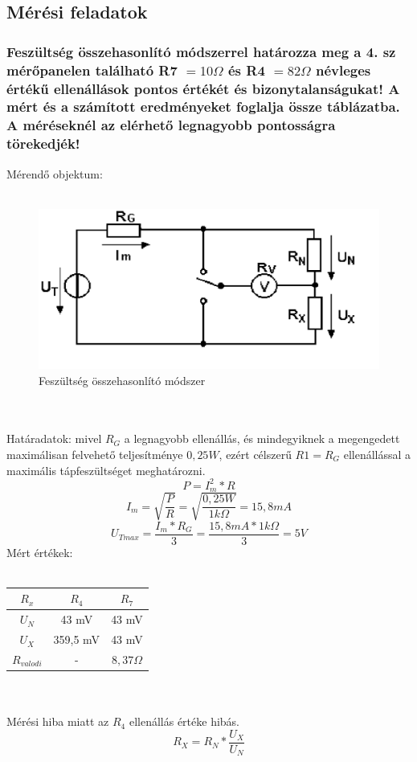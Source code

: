 \documentclass[10pt,a4paper]{article}
\begin{document}
	\subsection{Mérési feladatok}
		\subsubsection{Feszültség összehasonlító módszerrel határozza meg a 4. sz
mérőpanelen található R7 $= 10 \Omega $ és R4 $= 82 \Omega $ névleges értékű ellenállások pontos értékét és bizonytalanságukat!
A mért és a számított eredményeket foglalja össze táblázatba. A méréseknél
az elérhető legnagyobb pontosságra törekedjék!}
		Mérendő objektum:
		\\\\
		\begin{figure}[hbtp]
		\centering
		\includegraphics[scale=0.5]{teljes/fesz_ossze.png}
		\caption{Feszültség összehasonlító módszer}
		\end{figure}
		\\\\
		Határadatok: mivel $R_G$ a legnagyobb ellenállás, és mindegyiknek a megengedett maximálisan felvehető teljesítménye $0,25 W$, ezért célszerű $R1 = R_G$ ellenállással a maximális tápfeszültséget meghatározni.
		$$P = I^2_{m} * R$$
		$$I_m = \sqrt{\frac{P}{R}} = \sqrt{\frac{0,25W}{1k\Omega}} = 15,8 mA$$
		$$U_{Tmax} = \frac{I_m * R_G}{3} = \frac{15,8 mA * 1 k\Omega}{3} = 5 V$$
		Mért értékek:\\\\
		\begin{tabular}{|c|c|c|}
		\hline 
		$R_x$ & $R_4$ & $R_7$ \\ 
		\hline 
		$U_N$ & 43 mV & 43 mV \\ 
		\hline 
		$U_X$ & 359,5 mV & 43 mV \\ 
		\hline 
		$R_{valodi}$ & - & $8,37 \Omega$ \\ 
		\hline 
		\end{tabular} 
		\\\\ Mérési hiba miatt az $R_4$ ellenállás értéke hibás.$$R_X = R_N * \frac{U_X}{U_N}$$
		
\end{document}

